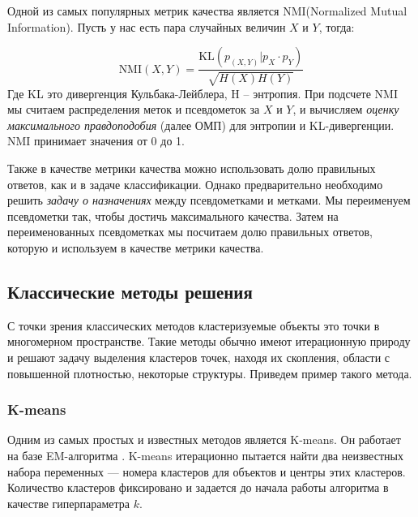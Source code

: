\documentclass[a4paper,12pt]{extarticle}
\begin{document}
Одной из самых популярных метрик качества является NMI(Normalized Mutual \\
Information).
Пусть у нас есть пара случайных величин $X$ и $Y$, тогда:

\[
	\text{NMI}(X,Y) = \frac{\text{KL}(p_{(X, Y)}| p_X \cdot p_Y)}{\sqrt{H(X)H(Y)}}
\]
Где KL это дивергенция Кульбака-Лейблера, H -- энтропия.
При подсчете NMI мы считаем распределения меток и псевдометок 
за $X$ и $Y$, и вычисляем \textit{оценку максимального правдоподобия} (далее ОМП) для 
энтропии и KL-дивергенции. NMI 
принимает значения от 0 до 1.




Также в качестве метрики качества можно использовать долю 
правильных ответов, как и в задаче классификации. Однако предварительно 
необходимо решить \textit{задачу о назначениях} \cite{assignment_problem}
между псевдометками и метками.
Мы переименуем псевдометки так, чтобы достичь максимального качества.
Затем на переименованных псевдометках мы посчитаем долю правильных ответов, которую 
и используем в качестве метрики качества.

\subsection{Классические методы решения}

С точки зрения классических методов кластеризуемые
объекты это точки в многомерном пространстве. Такие
методы обычно имеют итерационную природу и решают 
задачу выделения кластеров точек, находя их скопления, 
области с повышенной плотностью, некоторые структуры.
Приведем пример такого метода.

\subsubsection{K-means}

Одним из самых простых и известных методов является
K-means. Он работает на базе EM-алгоритма \cite{dempster1977maximum}.
K-means итерационно пытается найти два неизвестных набора переменных ---
номера кластеров для объектов и центры этих кластеров. 
Количество кластеров фиксировано и задается до начала 
работы алгоритма в качестве гиперпараметра $k$.
\end{document}
